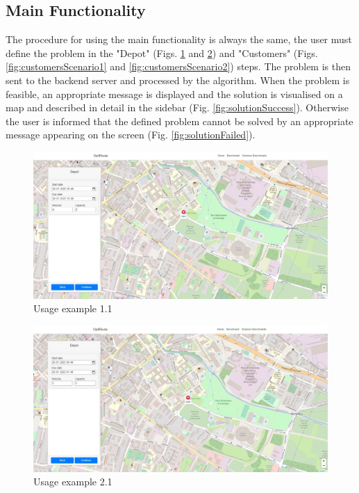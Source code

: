 \documentclass[a4paper,twoside,12pt]{book}
\begin{document}
\subsection{Main Functionality}
The procedure for using the main functionality is always the same, the user must define the problem in the "Depot" (Figs. \ref{fig:depotScenario1} and \ref{fig:depotScenario2}) and "Customers" (Figs. \ref{fig:customersScenario1} and \ref{fig:customersScenario2}) steps. The problem is then sent to the backend server and processed by the algorithm. When the problem is feasible, an appropriate message is displayed and the solution is visualised on a map and described in detail in the sidebar (Fig. \ref{fig:solutionSuccess}). Otherwise the user is informed that the defined problem cannot be solved by an appropriate message appearing on the screen (Fig. \ref{fig:solutionFailed}). 

\begin{figure}[H]
\centering
\includegraphics[width=\textwidth]{images/depotScenario1.jpg}
\caption{Usage example 1.1}
\label{fig:depotScenario1}
\end{figure}

\begin{figure}[H]
\centering
\includegraphics[width=\textwidth]{images/depotScenario2.jpg}
\caption{Usage example 2.1}
\label{fig:depotScenario2}
\end{figure}
\end{document}
